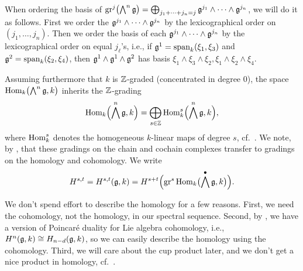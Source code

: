 \begin{remark}
  When ordering the basis of $\operatorname{gr}^{j} \bigl( \bigwedge^{n}\mathfrak{g} \bigr) = \bigoplus_{j_{1} + \dotsb + j_{n} = j} \mathfrak{g}^{j_{1}} \wedge \dotsb \wedge \mathfrak{g}^{j_{n}}$, we will do it as follows. First we order the $\mathfrak{g}^{j_{1}} \wedge \dotsb \wedge \mathfrak{g}^{j_{n}}$ by the lexicographical order on $(j_{1},\dotsc,j_{n})$. Then we order the basis of each $\mathfrak{g}^{j_{1}} \wedge \dotsb \wedge \mathfrak{g}^{j_{n}}$ by the lexicographical order on equal $j_{\ell}$'s, i.e., if $\mathfrak{g}^{1} = \operatorname{span}_{k}(\xi_{1},\xi_{3})$ and $\mathfrak{g}^{2} = \operatorname{span}_{k}(\xi_{2},\xi_{4})$, then $\mathfrak{g}^{1} \wedge \mathfrak{g}^{1} \wedge \mathfrak{g}^{2}$ has basis $\xi_{1} \wedge \xi_{3} \wedge \xi_{2}, \xi_{1} \wedge \xi_{2} \wedge \xi_{4}$.
\end{remark}

Assuming furthermore that $k$ is $\mathbb{Z}$-graded (concentrated in degree $0$), the space $\operatorname{Hom}_{k}\bigl( \bigwedge^{n}\mathfrak{g}, k \bigr)$ inherits the $\mathbb{Z}$-grading
\[
  \operatorname{Hom}_{k}\Bigl( \bigwedge^n \mathfrak{g}, k \Bigr) = \bigoplus_{s \in \mathbb{Z}} \operatorname{Hom}_{k}^s\Bigl( \bigwedge^n\mathfrak{g}, k \Bigr),
\]
where $\operatorname{Hom}_{k}^s$ denotes the homogeneous $k$-linear maps of degree $s$, cf.\ \cite[Lem.~4.2]{Fossum}. We note, by \cite[§3.7]{Fuks}, that these gradings on the chain and cochain complexes transfer to gradings on the homology and cohomology. We write
\begin{equation*}
  H^{s,t} = H^{s,t}(\mathfrak{g}, k) = H^{s+t}\Bigl( \operatorname{gr}^s \operatorname{Hom}_{k}\bigl(\bigwedge^{\bullet} \mathfrak{g}, k\bigr) \Bigr).
\end{equation*}%
%

\begin{remark}
  We don't spend effort to describe the homology for a few reasons. First, we need the cohomology, not the homology, in our spectral sequence. Second, by \cite[§3.6]{Fuks}, we have a version of Poincaré duality for Lie algebra cohomology, i.e., $H^{n}(\mathfrak{g},k) \cong H_{n-d}(\mathfrak{g},k)$, so we can easily describe the homology using the cohomology. Third, we will care about the cup product later, and we don't get a nice product in homology, cf.\ \cite[§3.2]{Fuks}.
\end{remark}

